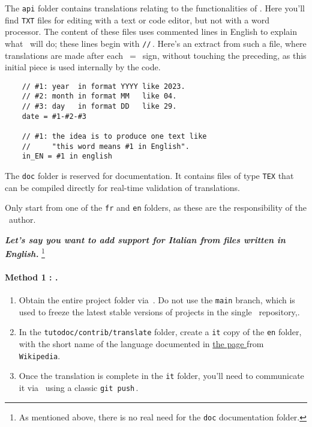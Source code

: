 \begin{tdocimp}
    The \verb#api# folder contains translations relating to the functionalities of \thisproj.
    Here you'll find \verb#TXT# files for editing with a text or code editor, but not with a word processor.
    The content of these files uses commented lines in English to explain what \thisproj\ will do; these lines begin with \verb#//#\,. Here's an extract from such a file, where translations are made after each \,$=$\ sign, without touching the preceding, as this initial piece is used internally by the \thisproj code.

    \tdocsep
    \vspace{-10pt}
    \begin{verbatim}
    // #1: year  in format YYYY like 2023.
    // #2: month in format MM   like 04.
    // #3: day   in format DD   like 29.
    date = #1-#2-#3

    // #1: the idea is to produce one text like
    //     "this word means #1 in English".
    in_EN = #1 in english\end{verbatim}
\end{tdocimp}


\begin{tdocnote}
    The \verb#doc# folder is reserved for documentation. It contains files of type \verb#TEX# that can be compiled directly for real-time validation of translations.
\end{tdocnote}


\begin{tdocwarn}
    Only start from one of the \verb#fr# and \verb#en# folders, as these are the responsibility of the \thisproj\ author.
\end{tdocwarn}


\medskip


\emph{\textbf{Let's say you want to add support for Italian from files written in English.}}%
\footnote{
    As mentioned above, there is no real need for the \texttt{doc} documentation folder.
}


\paragraph{Method 1 : \git.}

\begin{enumerate}
      \item Obtain the entire project folder via \thisrepo\,.
    Do not use the \verb#main# branch, which is used to freeze the latest stable versions of projects in the single \thismonorepo\ repository,.

      \item In the \verb#tutodoc/contrib/translate# folder, create a \verb#it# copy of the \verb#en# folder, with the short name of the language documented in
      \href{https://en.wikipedia.org/wiki/IETF_language_tag#List_of_common_primary_language_subtags}%
           {the page }
      from \texttt{Wikipedia}.

      \item Once the translation is complete in the \verb#it# folder, you'll need to communicate it via \thisrepo\ using a classic \verb#git push#\,.
\end{enumerate}


